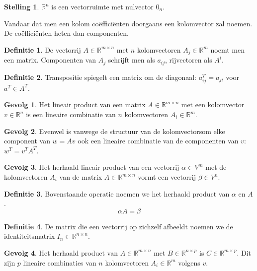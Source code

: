 \documentclass{amsart}
\theoremstyle{definition}
\newtheorem{thm}{Stelling}[section]
\newtheorem{dfn}{Definitie}[section]
\newtheorem{csq}{Gevolg}[section]
\newcommand{\realnums}{\mathbb{R}}
\newcommand{\realn}[1][n]{\realnums^{#1}}
\newcommand{\realmx}[2][n]{\realn[#2 \times #1]}
\newcommand{\realnxn}{\realmx{n}}
\newcommand{\realmxn}{\realmx{m}}
\begin{document}
\begin{thm}
	$\realn$ is een vectorruimte met nulvector $0_n$.
\end{thm}

Vandaar dat men een kolom coëfficiënten doorgaans een kolomvector zal noemen. De coëfficiënten heten dan componenten.

\begin{dfn}
	De vectorrij $A \in \realn[m \times n]$ met $n$ kolomvectoren $A_{j} \in \realn[m]$ noemt men een matrix.
	Componenten van $A_j$ schrijft men als $a_{ij}$, rijvectoren als $A^i$.
\end{dfn}

\begin{dfn}
	Transpositie spiegelt een matrix om de diagonaal: $a^T_{ij} = a_{ji}$ voor $a^T \in A^T$.
\end{dfn}

\begin{csq}
	Het lineair product van een matrix $A \in \realmxn$ met een kolomvector $v \in \realn$ is een lineaire combinatie van $n$ kolomvectoren $A_i \in \realn[m]$.
\end{csq}

\begin{csq}
	Evenwel is vanwege de structuur van de kolomvectorsom elke component van $w = Av$ ook een lineaire combinatie van de componenten van $v$: $w^T = v^TA^T$.
\end{csq}

\begin{csq}
	Het herhaald lineair product van een vectorrij $\alpha \in V^m$ met de kolomvectoren $A_i$ van de matrix $A \in \realmxn$ vormt een vectorrij $\beta \in V^n$.
\end{csq}

\begin{dfn}
	Bovenstaande operatie noemen we het herhaald product van $\alpha$ en $A$.
	\begin{equation*}
		\alpha A = \beta
	\end{equation*}
\end{dfn}

\begin{dfn}
	De matrix die een vectorrij op zichzelf afbeeldt noemen we de identiteitsmatrix $I_n \in \realnxn$.
\end{dfn}

\begin{csq}
	Het herhaald product van $A \in \realmxn$ met $B \in \realn[n \times p]$ is $C \in \realn[m \times p]$.
	Dit zijn $p$ lineaire combinaties van $n$ kolomvectoren $A_i \in \realn[m]$ volgens $v$.
\end{csq}
\end{document}
